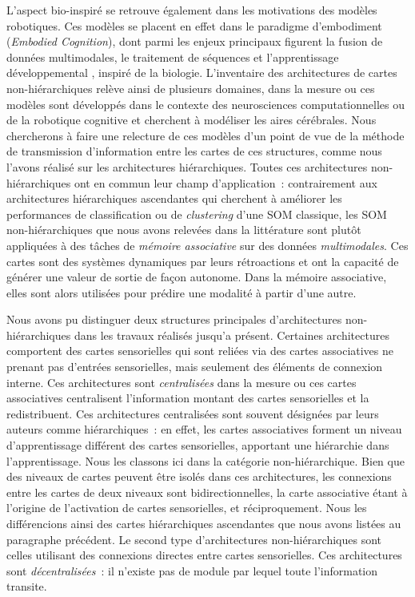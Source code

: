\documentclass[../main]{subfiles}
\begin{document}
{L'aspect bio-inspiré se retrouve également dans les motivations des modèles robotiques. Ces modèles se placent en effet dans le paradigme d'embodiment (\emph{Embodied Cognition}), dont parmi les enjeux principaux figurent la fusion de données multimodales, le traitement de séquences et l'apprentissage développemental \cite{Smith2005TheDO}, inspiré de la biologie. 
L'inventaire des architectures de cartes non-hiérarchiques relève ainsi de plusieurs domaines, dans la mesure ou ces modèles sont développés dans le contexte des neurosciences computationnelles ou de la robotique cognitive et cherchent à modéliser les aires cérébrales. 
Nous chercherons à faire une relecture de ces modèles d'un point de vue de la méthode de transmission d'information entre les cartes de ces structures, comme nous l'avons réalisé sur les architectures hiérarchiques.
Toutes ces architectures non-hiérarchiques ont en commun leur champ d'application~: contrairement aux architectures hiérarchiques ascendantes qui cherchent à améliorer les performances de classification ou de \emph{clustering} d'une SOM classique, les SOM non-hiérarchiques que nous avons relevées dans la littérature sont plutôt appliquées à des tâches de \emph{mémoire associative} sur des données \emph{multimodales}.
Ces cartes sont des systèmes dynamiques par leurs rétroactions et ont la capacité de générer une valeur de sortie de façon autonome. Dans la mémoire associative, elles sont alors utilisées pour prédire une modalité à partir d'une autre.


Nous avons pu distinguer deux structures principales d'architectures non-hiérarchiques dans les travaux réalisés jusqu'a présent.
Certaines architectures comportent des cartes sensorielles qui sont reliées via des cartes associatives ne prenant pas d'entrées sensorielles, mais seulement des éléments de connexion interne. 
Ces architectures sont \emph{centralisées} dans la mesure ou ces cartes associatives centralisent l'information  montant des cartes sensorielles et la redistribuent. Ces architectures centralisées sont souvent désignées par leurs auteurs comme hiérarchiques~: en effet, les cartes associatives forment un niveau d'apprentissage différent des cartes sensorielles, apportant une hiérarchie dans l'apprentissage. Nous les classons ici dans la catégorie non-hiérarchique. Bien que des niveaux de cartes peuvent être isolés dans ces architectures, les connexions entre les cartes de deux niveaux sont bidirectionnelles, la carte associative étant à l'origine de l'activation de cartes sensorielles, et réciproquement.
Nous les différencions ainsi des cartes hiérarchiques ascendantes que nous avons listées au paragraphe précédent.
Le second type d'architectures non-hiérarchiques sont celles utilisant des connexions directes entre cartes sensorielles. Ces architectures sont \emph{décentralisées}~: il n'existe pas de module par lequel toute l'information transite.

}
\end{document}

